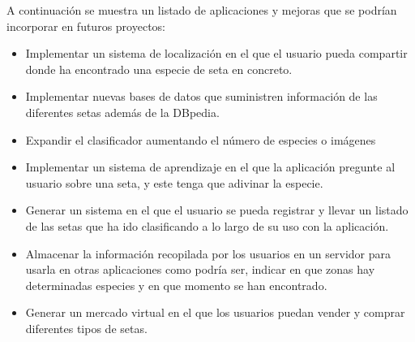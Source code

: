 A continuación se muestra un listado de aplicaciones y mejoras que se podrían incorporar en futuros proyectos:

\begin{itemize}
	\item Implementar un sistema de localización en el que el usuario pueda compartir donde ha encontrado una especie de seta en concreto.
	\item Implementar nuevas bases de datos que suministren información de las diferentes setas además de la DBpedia.
	\item Expandir el clasificador aumentando el número de especies o imágenes
	\item Implementar un sistema de aprendizaje en el que la aplicación pregunte al usuario sobre una seta, y este tenga que adivinar la especie.
	\item Generar un sistema en el que el usuario se pueda registrar y llevar un listado de las setas que ha ido clasificando a lo largo de su uso con la aplicación.
	\item Almacenar la información recopilada por los usuarios en un servidor para usarla en otras aplicaciones como podría ser, indicar en que zonas hay determinadas especies y en que momento se han encontrado.
	\item Generar un mercado virtual en el que los usuarios puedan vender y comprar diferentes tipos de setas.
\end{itemize}
